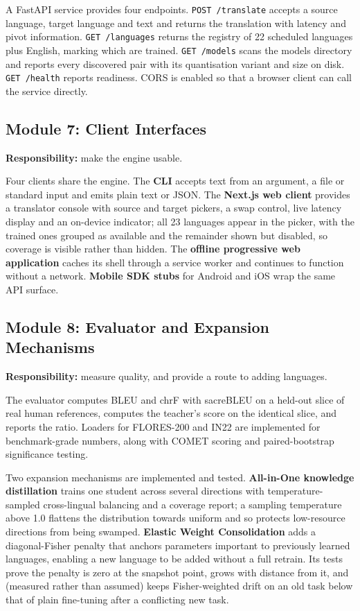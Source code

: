 A FastAPI service provides four endpoints. \texttt{POST /translate} accepts a
source language, target language and text and returns the translation with
latency and pivot information. \texttt{GET /languages} returns the registry of
22 scheduled languages plus English, marking which are trained. \texttt{GET
/models} scans the models directory and reports every discovered pair with its
quantisation variant and size on disk. \texttt{GET /health} reports readiness.
CORS is enabled so that a browser client can call the service directly.

\subsection{Module 7: Client Interfaces}
\label{subsec:mod7}

\textbf{Responsibility:} make the engine usable.

Four clients share the engine. The \textbf{CLI} accepts text from an argument, a
file or standard input and emits plain text or JSON. The \textbf{Next.js web
client} provides a translator console with source and target pickers, a swap
control, live latency display and an on-device indicator; all 23 languages
appear in the picker, with the trained ones grouped as available and the
remainder shown but disabled, so coverage is visible rather than hidden. The
\textbf{offline progressive web application} caches its shell through a service
worker and continues to function without a network. \textbf{Mobile SDK stubs}
for Android and iOS wrap the same API surface.

\subsection{Module 8: Evaluator and Expansion Mechanisms}
\label{subsec:mod8}

\textbf{Responsibility:} measure quality, and provide a route to adding
languages.

The evaluator computes BLEU and chrF with sacreBLEU on a held-out slice of real
human references, computes the teacher's score on the identical slice, and
reports the ratio. Loaders for FLORES-200 and IN22 are implemented for
benchmark-grade numbers, along with COMET scoring and paired-bootstrap
significance testing.

Two expansion mechanisms are implemented and tested. \textbf{All-in-One
knowledge distillation} trains one student across several directions with
temperature-sampled cross-lingual balancing and a coverage report; a sampling
temperature above 1.0 flattens the distribution towards uniform and so protects
low-resource directions from being swamped. \textbf{Elastic Weight
Consolidation} adds a diagonal-Fisher penalty that anchors parameters important
to previously learned languages, enabling a new language to be added without a
full retrain. Its tests prove the penalty is zero at the snapshot point, grows
with distance from it, and (measured rather than assumed) keeps
Fisher-weighted drift on an old task below that of plain fine-tuning after a
conflicting new task.

